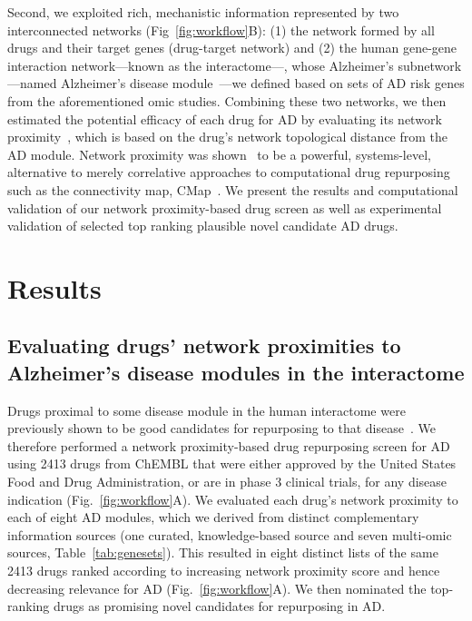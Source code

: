 \documentclass[letterpaper]{article}
\begin{document}
Second, we exploited rich, mechanistic information represented by two
interconnected networks (Fig~\ref{fig:workflow}B): (1) the network formed by
all drugs and their target genes (drug-target network) and (2) the human
gene-gene interaction network---known as the interactome---, whose Alzheimer's
subnetwork---named Alzheimer's disease module~\citep{Barabasi2011}---we
defined based on sets of AD risk genes from
the aforementioned omic studies.  Combining these two networks, we then
estimated the potential efficacy of each drug for AD by evaluating its network
proximity~\citep{Guney2016}, which is based on the drug's network topological
distance from the AD module.  Network proximity was shown~\citep{Cheng2018} to
be a powerful, systems-level, alternative to merely correlative approaches to
computational drug repurposing such as the connectivity map,
CMap~\citep{Lamb2006}.  We present the results and computational validation of
our network proximity-based drug screen as well as experimental validation of
selected top ranking plausible novel candidate AD drugs.

\section{Results}

\subsection{Evaluating drugs' network proximities to Alzheimer's disease
modules in the interactome}

Drugs proximal to some disease module in the human interactome were previously
shown to be good candidates for repurposing to that disease~\citep{Cheng2018}.
We therefore performed a network proximity-based drug repurposing screen for
AD using 2413 drugs from ChEMBL that were either approved by the United States
Food and Drug Administration, or are in phase 3 clinical trials, for any
disease indication (Fig.~\ref{fig:workflow}A).  We evaluated each drug's
network proximity to each of eight AD modules, which we derived from distinct
complementary information sources (one curated, knowledge-based source and
seven multi-omic sources, Table~\ref{tab:genesets}).  This resulted in eight
distinct lists of the same 2413 drugs ranked according to increasing network
proximity score and hence decreasing relevance for AD
(Fig.~\ref{fig:workflow}A). We then nominated the top-ranking drugs as
promising novel candidates for repurposing in AD.
\end{document}
